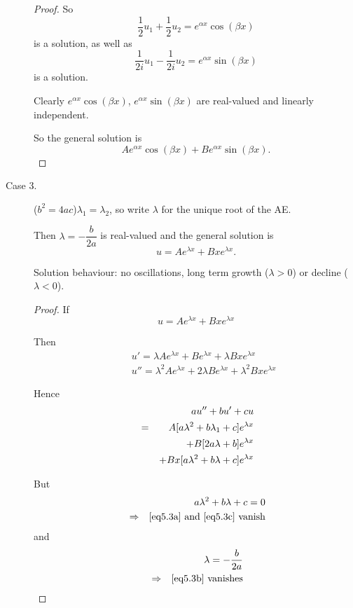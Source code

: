 \begin{description}
\begin{proof}
So
\[
 \dfrac{1}{2}u_1 + \dfrac{1}{2}u_2 = e^{\alpha x} \cos(\beta x)
\]
is a solution, as well as 
\[
 \dfrac{1}{2i}u_1 - \dfrac{1}{2i}u_2 = e^{\alpha x} \sin(\beta x)
\]
is a solution.

Clearly $e^{\alpha x} \cos(\beta x)$, $e^{\alpha x} \sin(\beta x)$ are real-valued and  linearly independent. 

So the general solution is
\[
 A e^{\alpha x} \cos(\beta x) + B e^{\alpha x} \sin(\beta x).
\]
\end{proof}

 \item[Case 3.] ($b^2=4ac$)\quad $\lambda_1=\lambda_2$, so write $\lambda$ for the unique root of the AE.
 
Then $\lambda = - \dfrac{b}{2a}$  is real-valued and the general solution is
 \[
  u=Ae^{\lambda x} + Bx e^{\lambda x}.
 \]

 Solution behaviour: no oscillations, long term growth ($\lambda>0$) or decline ($\lambda<0$).


 \begin{proof}
  If
  \[
   u = Ae^{\lambda x} + B x e^{\lambda x}
  \]
  
  Then
  \begin{eqnarray*}
   &&    u' = \lambda Ae^{\lambda x}+ B e^{\lambda x} + \lambda B x e^{\lambda x}
\\
   &&    u'' = \lambda^2 Ae^{\lambda x}+ 2\lambda B e^{\lambda x} %
+ \lambda^2 B x e^{\lambda x}
  \end{eqnarray*}
  
  Hence
  \begin{eqnarray}
   && au'' + bu' +cu \notag\\
   &=& \quad A [a\lambda^2 + b\lambda_1 + c]e^{\lambda x}\label{eq5.3a}\\
   &&  + B [2a\lambda + b]e^{\lambda x}\label{eq5.3b}\\
   &&  + B x [a\lambda^2 + b\lambda + c]e^{\lambda x}\label{eq5.3c}
  \end{eqnarray}

  But
  \begin{eqnarray*}
   && a\lambda^2 + b\lambda + c = 0\\
   &\Rightarrow& \text{\eqref{eq5.3a} and \eqref{eq5.3c} vanish}
  \end{eqnarray*}
and
  \begin{eqnarray*}
   && \lambda = - \dfrac{b}{2a}\\
   &\Rightarrow& \text{\eqref{eq5.3b} vanishes}
  \end{eqnarray*}

 \end{proof}

 \end{description}

